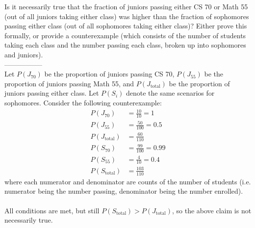 \documentclass[11pt,fleqn]{article}
\begin{document}
\begin{enumerate}
Is it necessarily true that the fraction of juniors passing either CS 70 or Math 55 (out of all juniors taking either class) was higher than the fraction of sophomores passing either class (out of all sophomores taking either class)? Either prove this formally, or provide a counterexample (which consists of the number of students taking each class and the number passing each class, broken up into sophomores and juniors). \\
-----------------\\
Let $P(J_{70})$ be the proportion of juniors passing CS 70, $P(J_{55})$ be the proportion of juniors passing Math 55, and $P(J_{\text{total}})$ be the proportion of juniors passing either class. Let $P(S_i)$ denote the same scenarios for sophomores. Consider the following counterexample:
\begin{align*}
P(J_{70}) &= \frac{10}{10} = 1 \\
P(J_{55}) &= \frac{50}{100} = 0.5 \\
P(J_{\text{total}}) &= \frac{60}{110} \\
P(S_{70}) &= \frac{99}{100} = 0.99 \\
P(S_{55}) &= \frac{4}{10} = 0.4 \\
P(S_{\text{total}}) &= \frac{103}{110}
\end{align*}
where each numerator and denominator are counts of the number of students (i.e. numerator being the number passing, denominator being the number enrolled). \\\\
All conditions are met, but still $P(S_{\text{total}}) > P(J_{\text{total}})$, so the above claim is not necessarily true.

\end{enumerate}
\end{document}
